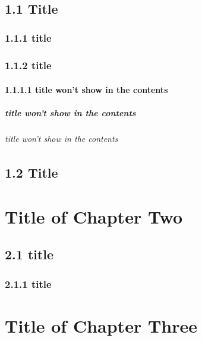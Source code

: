 \documentclass[a4paper,12pt,UTF8,openright]{book}
\begin{document}
 \\
 \\
 \\

\lipsum[1-5]

\section{1.1 Title}
\lipsum[1-10]

\subsection{1.1.1 title}
\lipsum[1-5]

\subsection{1.1.2 title}
\lipsum[1-5]

\subsubsection{1.1.1.1 title won't show in the contents}
\lipsum[1-5]

\paragraph{title won't show in the contents}
\lipsum[1-5]

\subparagraph{title won't show in the contents}
\lipsum[1-5]

\section{1.2 Title}
\lipsum[1-5]

\chapter{Title of Chapter Two}
\lipsum[1-5]

\section{2.1 title}
\lipsum[1-5]

\subsection{2.1.1 title}
\lipsum[1-5]

\chapter{Title of Chapter Three}
\lipsum[1-5]
\end{document}
